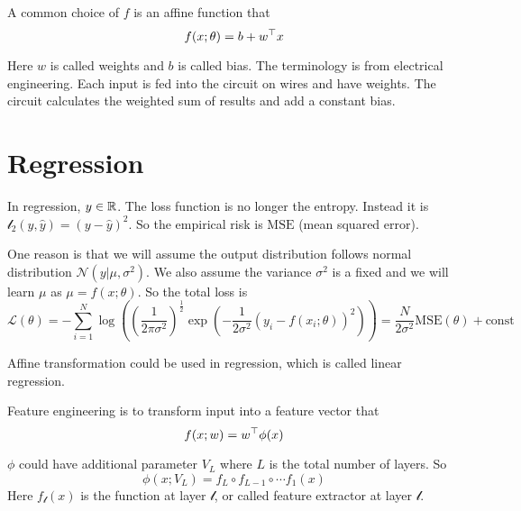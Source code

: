 \begin{example}
    A common choice of $f$ is an affine function that
\begin{equation}
    f(x;\theta) = b + {w}^\top x
\end{equation}

Here $w$ is called weights and $b$ is called bias. The terminology is from electrical engineering. Each input is fed into the circuit on wires and have weights. The circuit calculates the weighted sum of results and add a constant bias.
\end{example}


\section{Regression}

In regression, $y \in \mathbb{R}$. The loss function is no longer the entropy. Instead it is $\mathcal{l}_2 (y, \hat{y}) = (y - \hat{y})^2$. So the empirical risk is $\mathrm{MSE}$ (mean squared error).

\begin{theorem}
    One reason is that we will assume the output distribution follows normal distribution $\mathcal{N}(y|\mu,\sigma^2)$. We also assume the variance $\sigma^2$ is a fixed and we will learn $\mu$ as $\mu = f(x;\theta)$. So the total loss is
\begin{equation}
    \mathcal{L}(\theta) = - \sum_{i=1}^N \log \left( \left(\frac{1}{2\pi \sigma^2}\right)^{\frac{1}{2}} \exp\left(- \frac{1}{2 \sigma^2} \left( y_i - f(x_i ; \theta) \right)^2 \right) \right) = \frac{N}{2\sigma^2} \mathrm{MSE}(\theta) + \mathrm{const}
\end{equation}
\end{theorem}




Affine transformation could be used in regression, which is called linear regression.

\begin{definition}
    Feature engineering is to transform input into a feature vector that 
    \begin{equation}
        f(x;w) = {w}^\top \phi(x)
    \end{equation}
\end{definition}

\begin{definition}\label{multi_layer_percepton}
    $\phi$ could have additional parameter $V_L$ where $L$ is the total number of layers. So
    \begin{equation}
        \phi(x;V_L) = f_L \circ f_{L-1} \circ \cdots f_1 (x)
    \end{equation}
    Here $f_{\mathcal{l}}(x)$ is the function at layer $\mathcal{l}$, or called feature extractor at layer $\mathcal{l}$.
\end{definition}


